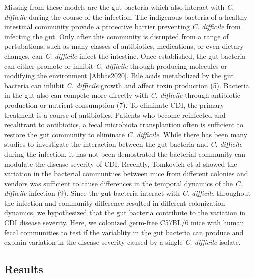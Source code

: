 \documentclass[
  12pt,
]{article}
\begin{document}
Missing from these models are the gut bacteria which also interact with
\emph{C. difficile} during the course of the infection. The indigenous
bacteria of a healthy intestinal community provide a protective barrier
preventing \emph{C. difficile} from infecting the gut. Only after this
community is disrupted from a range of pertubations, such as many
classes of antibiotics, medications, or even dietary changes, can
\emph{C. difficile} infect the intestine. Once established, the gut
bacteria can either promote or inhibit \emph{C. difficile} through
producing molecules or modifying the environment {[}Abbas2020{]}. Bile
acids metabolized by the gut bacteria can inhibit \emph{C. difficile}
growth and affect toxin production (5). Bacteria in the gut also can
compete more directly with \emph{C. difficile} through antibiotic
production or nutrient consumption (7). To eliminate CDI, the primary
treatment is a course of antibiotics. Patients who become reinfected and
recalitrant to antibiotics, a fecal microbiota transplantion often is
sufficient to restore the gut community to eliminate \emph{C.
difficile}. While there has been many studies to investigate the
interaction between the gut bacteria and \emph{C. difficile} during the
infection, it has not been demostrated the bacterial community can
modulate the disease severity of CDI. Recently, Tomkovich et al showed
the variation in the bacterial communtiies between mice from different
colonies and vendors was sufficient to cause differences in the temporal
dynamics of the \emph{C. difficile} infection (9). Since the gut
bacteria interact with \emph{C. difficile} throughout the infection and
community difference resulted in different colonization dynamics, we
hypothesized that the gut bacteria contribute to the variation in CDI
disease severity. Here, we colonized germ-free C57BL/6 mice with human
fecal communities to test if the variablity in the gut bacteria can
produce and explain variation in the disease severity caused by a single
\emph{C. difficile} isolate.

\hypertarget{results}{%
\subsection{Results}\label{results}}
\end{document}
